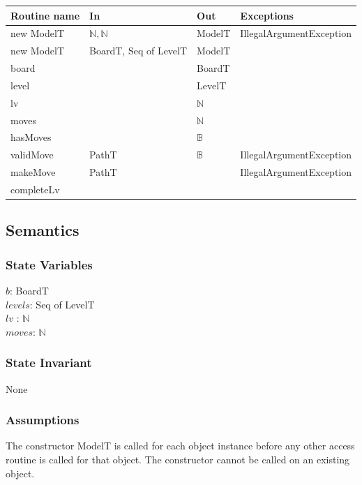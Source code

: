 \documentclass[12pt]{article}
\begin{document}
\begin{tabular}{| l | l | l | l |}
	\hline
	\textbf{Routine name} & \textbf{In} & \textbf{Out} & \textbf{Exceptions}\\
	\hline
	new ModelT & $\mathbb{N}, \mathbb{N}$ & ModelT & IllegalArgumentException\\
	\hline
	new ModelT & BoardT, Seq of LevelT & ModelT & ~\\
	\hline
	board & ~ & BoardT & ~\\
	\hline
	level & ~ & LevelT & ~\\
	\hline
	lv & ~ & $\mathbb{N}$ & ~\\
	\hline
	moves & ~ & $\mathbb{N}$ & ~\\
	\hline
	hasMoves & ~ & $\mathbb{B}$ & ~\\
	\hline
	validMove & PathT & $\mathbb{B}$ & IllegalArgumentException\\
	\hline
	makeMove & PathT & ~ & IllegalArgumentException\\
	\hline
	completeLv & ~ & ~ & ~\\
	\hline
\end{tabular}

\subsection* {Semantics}

\subsubsection* {State Variables}

$b$: BoardT\\
$levels$: Seq of LevelT\\
$lv$ : $\mathbb{N}$\\
$moves$: $\mathbb{N}$

\subsubsection* {State Invariant}

None

\subsubsection* {Assumptions}

The constructor ModelT is called for each object instance before any other
access routine is called for that object.  The constructor cannot be called on
an existing object.
\end{document}
